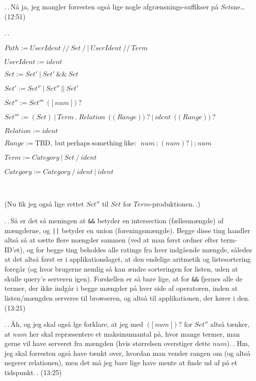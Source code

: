 \documentclass{report}
\begin{document}
.\,.\,Nå ja, jeg mangler forresten også lige nogle afgrænsnings-suffikser på $Set$sne\ldots (12:51)

.\,.\,

$Path := UserIdent\ \texttt{//}\ Set\ \texttt{/}\ |\ UserIdent\ \texttt{//}\ Term$

$UserIdent := ident$

$Set := Set'\ |\ Set'\ \texttt{\&\&}\ Set$ 

$Set' := Set''\ |\ Set''\ \texttt{||}\ Set'$ 

$Set'' := Set'''\ (\texttt{[}\ num\ \texttt{]})? $ 

$Set''' := (Set)\ |\ 
	Term\ \texttt{.}\ Relation\ (\texttt{(}\ Range\ \texttt{)})?\ |\ 
	ident\ (\texttt{(}\ Range\ \texttt{)})?
$ 

$Relation := ident$


$Range := \mathrm{TBD,\ but\ perhaps\ something\ like\!:}\ \ 
	num\ \texttt{;}\ (num)?\ |\ 
	\texttt{;}\ num
$

$Term := Category\ |\ Set\ \texttt{/}\ ident$

$Category := Category\ \texttt{/}\ ident\ |\ ident$

\ 

\noindent(Nu fik jeg også lige rettet $Set''$ til $Set$ for $Term$-produktionen.\,.)

.\,.\,Så er det så meningen at \texttt{\&\&} betyder en intersection (fællesmængde) af mængderne, og \texttt{||} betyder en union (foreningsmængde). Begge disse ting handler altså så at sætte flere mængder sammen (ved at man først ordner efter term-ID'et), og for begge ting beholdes alle ratings fra hver indgående mængde, således at det altså først er i applikationslaget, at den endelige aritmetik og listesortering foregår (og hvor brugerne nemlig så kan ændre sorteringen for listen, uden at skulle query'e serveren igen). Forskellen er så bare lige, at for \texttt{\&\&} fjernes alle de termer, der ikke indgår i begge mængder på hver side af operatoren, inden at listen/mængden serveres til browseren, og altså til applikationen, der kører i den. (13:21) 

.\,.\,Åh, og jeg skal også lge forklare, at jeg med $(\texttt{[}\ num\ \texttt{]})?$ for $Set''$ altså tænker, at $num$ her skal repræsentere et maksimumantal på, hvor mange termer, man gerne vil have serveret fra mængden (hvis størrelsen overstiger dette $num$).\,. Hm, jeg skal forresten også have tænkt over, hvordan man vender rangen om (og altså negerer relationen), men det må jeg bare lige have mente at finde ud af på et tidspunkt.\,. (13:25)
\end{document}
